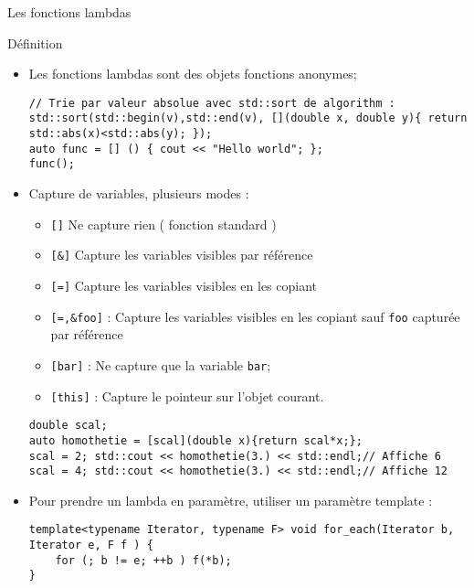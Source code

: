 \documentclass[handout,10pt]{beamer}
\begin{document}
\begin{frame}[fragile]{Les fonctions lambdas}
\tiny
\begin{block}{Définition}
 \begin{itemize}
  \item Les fonctions lambdas sont des objets fonctions anonymes;
\begin{lstlisting}
// Trie par valeur absolue avec std::sort de algorithm :
std::sort(std::begin(v),std::end(v), [](double x, double y){ return std::abs(x)<std::abs(y); });
auto func = [] () { cout << "Hello world"; };
func();
\end{lstlisting}
  \item Capture de variables, plusieurs modes :
  \begin{itemize}
  \item \lstinline$[]$ Ne capture rien ( fonction standard )
  \item \lstinline$[&]$ Capture les variables visibles par référence
  \item \lstinline$[=]$ Capture les variables visibles en les copiant
  \item \lstinline$[=,&foo]$ : Capture les variables visibles en les copiant sauf \lstinline$foo$ capturée par référence
  \item \lstinline$[bar]$ : Ne capture que la variable \lstinline$bar$;
  \item \lstinline$[this]$ : Capture le pointeur sur l'objet courant.
  \end{itemize}
\begin{lstlisting}
double scal;
auto homothetie = [scal](double x){return scal*x;};
scal = 2; std::cout << homothetie(3.) << std::endl;// Affiche 6
scal = 4; std::cout << homothetie(3.) << std::endl;// Affiche 12
\end{lstlisting}
  \item Pour prendre un lambda en paramètre, utiliser un paramètre template :
\begin{lstlisting}
template<typename Iterator, typename F> void for_each(Iterator b, Iterator e, F f ) {
    for (; b != e; ++b ) f(*b);
}
\end{lstlisting}

 \end{itemize}
\end{block}
\end{frame}
\end{document}
